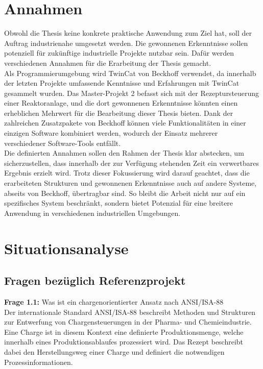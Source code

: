 \section{Annahmen} \label{Annahmen}
	Obwohl die Thesis keine konkrete praktische Anwendung zum Ziel hat, soll der Auftrag industrienahe umgesetzt werden. Die gewonnenen Erkenntnisse sollen potenziell für zukünftige industrielle Projekte nutzbar sein. Dafür werden verschiedenen Annahmen für die Erarbeitung der Thesis gemacht. 
	\\
	Als Programmierumgebung wird TwinCat von Beckhoff verwendet, da innerhalb der letzten Projekte umfassende Kenntnisse und Erfahrungen mit TwinCat gesammelt wurden. Das Master-Projekt 2 befasst sich mit der Rezeptursteuerung einer Reaktoranlage, und die dort gewonnenen Erkenntnisse könnten einen erheblichen Mehrwert für die Bearbeitung dieser Thesis bieten. Dank der zahlreichen Zusatzpakete von Beckhoff können viele Funktionalitäten in einer einzigen Software kombiniert werden, wodurch der Einsatz mehrerer verschiedener Software-Tools entfällt.
	\\ 
	Die definierten Annahmen sollen den Rahmen der Thesis klar abstecken, um sicherzustellen, dass innerhalb der zur Verfügung stehenden Zeit ein verwertbares Ergebnis erzielt wird. Trotz dieser Fokussierung wird darauf geachtet, dass die erarbeiteten Strukturen und gewonnenen Erkenntnisse auch auf andere Systeme, abseits von Beckhoff, übertragbar sind. So bleibt die Arbeit nicht nur auf ein spezifisches System beschränkt, sondern bietet Potenzial für eine breitere Anwendung in verschiedenen industriellen Umgebungen.
	

\section{Situationsanalyse} \label{Situationsanalyse}

	\subsection{Fragen bezüglich Referenzprojekt} \label{Fragen bezüglich Referenzprojekt}
	
	\textbf{Frage 1.1:} Was ist ein chargenorientierter Ansatz nach ANSI/ISA-88 \vspace{2mm} 
	\\
		Der internationale Standard ANSI/ISA-88 beschreibt Methoden und Strukturen zur Entwerfung von Chargensteuerungen in der Pharma- und Chemieindustrie. Eine Charge ist in diesem Kontext eine definierte Produktionsmenge, welche innerhalb eines Produktionsablaufes prozessiert wird.  Das Rezept beschreibt dabei den Herstellungsweg einer Charge und definiert die notwendigen Prozessinformationen. 
		
